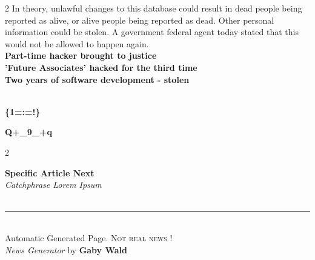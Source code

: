 \begin{multicols}{2}
In theory, unlawful changes to this database could result in dead people being reported as alive, or alive people being reported as dead. Other personal information could be stolen.
A government federal agent today stated that this would not be allowed to happen again.~\\

\textbf{Part-time hacker brought to justice}~\\
\textbf{'Future Associates' hacked for the third time}~\\
\textbf{Two years of software development - stolen}~\\
\vfill~\columnbreak


\begin{center} { \Huge \setmainfont{FoglihtenDeH02} \textbf{\{1=:=!\}} } \end{center} %

\begin{center} { \Huge \setmainfont{FoglihtenDeH02} \textbf{Q+\_9\_+q} } \end{center} %

\begin{multicols}{2}

\textbf{Specific Article Next}~\\

\emph{Catchphrase Lorem Ipsum}~\\

\lipsum[5-7]~\\

\end{multicols}

{\centering \rule{0.34\textwidth}{1pt} }~\\

Automatic Generated Page. \textsc{Not real news !}~\\
\emph{News Generator} by \textbf{Gaby Wald}~\\

\end{multicols}



